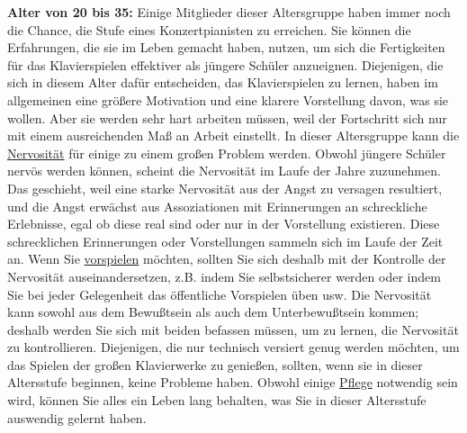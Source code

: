 \textbf{Alter von 20 bis 35:}
Einige Mitglieder dieser Altersgruppe haben immer noch die Chance, die Stufe eines Konzertpianisten zu erreichen.
Sie können die Erfahrungen, die sie im Leben gemacht haben, nutzen, um sich die Fertigkeiten für das Klavierspielen effektiver als jüngere Schüler anzueignen.
Diejenigen, die sich in diesem Alter dafür entscheiden, das Klavierspielen zu lernen, haben im allgemeinen eine größere Motivation und eine klarere Vorstellung davon, was sie wollen.
Aber sie werden sehr hart arbeiten müssen, weil der Fortschritt sich nur mit einem ausreichenden Maß an Arbeit einstellt.
In dieser Altersgruppe kann die \hyperref[c1iii15]{Nervosität} für einige zu einem großen Problem werden.
Obwohl jüngere Schüler nervös werden können, scheint die Nervosität im Laufe der Jahre zuzunehmen.
Das geschieht, weil eine starke Nervosität aus der Angst zu versagen resultiert, und die Angst erwächst aus Assoziationen mit Erinnerungen an schreckliche Erlebnisse, egal ob diese real sind oder nur in der Vorstellung existieren.
Diese schrecklichen Erinnerungen oder Vorstellungen sammeln sich im Laufe der Zeit an.
Wenn Sie \hyperref[c1iii14]{vorspielen} möchten, sollten Sie sich deshalb mit der Kontrolle der Nervosität auseinandersetzen, z.B. indem Sie selbstsicherer werden oder indem Sie bei jeder Gelegenheit das öffentliche Vorspielen üben usw.
Die Nervosität kann sowohl aus dem Bewußtsein als auch dem Unterbewußtsein kommen; deshalb werden Sie sich mit beiden befassen müssen, um zu lernen, die Nervosität zu kontrollieren.
Diejenigen, die nur technisch versiert genug werden möchten, um das Spielen der großen Klavierwerke zu genießen, sollten, wenn sie in dieser Altersstufe beginnen, keine Probleme haben.
Obwohl einige \hyperref[c1iii6c]{Pflege} notwendig sein wird, können Sie alles ein Leben lang behalten, was Sie in dieser Altersstufe auswendig gelernt haben.


\label{c1iii18c35}


